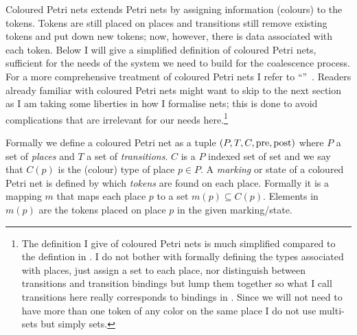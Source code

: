 Coloured Petri nets extends Petri nets by assigning information (colours) to the tokens. Tokens are still placed on places and transitions still remove existing tokens and put down new tokens; now, however, there is data associated with each token. Below I will give a simplified definition of coloured Petri nets, sufficient for the needs of the system we need to build for the coalescence process. For a more comprehensive treatment of coloured Petri nets I refer to \citeauthor{Jensen:2009ti} ``''~\cite{Jensen:2009ti}. Readers already familiar with coloured Petri nets might want to skip to the next section as I am taking some liberties in how I formalise nets; this is done to avoid complications that are irrelevant for our needs here.\footnote{The definition I give of coloured Petri nets is much simplified compared to the defintion in \citet{Jensen:2009ti}. I do not bother with formally defining the types associated with places, just assign a set to each place, nor distinguish between transitions and transition bindings but lump them together so what I call transitions here really corresponds to bindings in \citet{Jensen:2009ti}. Since we will not need to have more than one token of any color on the same place I do not use multi-sets but simply sets.}

Formally we define a coloured Petri net as a tuple $(P,T,C,\operatorname{pre},\operatorname{post})$ where $P$ a set of \emph{places} and $T$ a set of \emph{transitions}. $C$ is a $P$ indexed set of set and we say that $C(p)$ is the (colour) type of place $p\in P$. A \emph{marking} or state of a coloured Petri net is defined by which \emph{tokens} are found on each place. Formally it is a mapping $m$ that maps each place $p$ to a set $m(p)\subseteq C(p)$. Elements in $m(p)$ are the tokens placed on place $p$ in the given marking/state.


